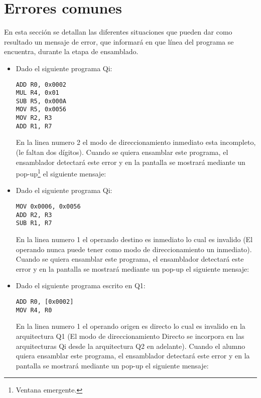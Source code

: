 \section{Errores comunes}


En esta sección se detallan las diferentes situaciones que pueden dar como resultado un mensaje de error, que informará en que línea del programa se encuentra, durante la etapa de ensamblado.

\begin{itemize}

\item Dado el siguiente programa Qi:

\begin{verbatim}
ADD R0, 0x0002
MUL R4, 0x01
SUB R5, 0x000A
MOV R5, 0x0056
MOV R2, R3
ADD R1, R7
\end{verbatim}

En la linea numero 2 el modo de direccionamiento inmediato esta incompleto, (le faltan dos dígitos). Cuando se quiera ensamblar este programa, el ensamblador detectará este error y en la pantalla se mostrará mediante un pop-up\footnote{Ventana emergente.} el siguiente mensaje:
 

\item Dado el siguiente programa Qi:

\begin{verbatim}
MOV 0x0006, 0x0056
ADD R2, R3
SUB R1, R7
\end{verbatim}

En la linea numero 1 el operando destino es inmediato lo cual es invalido (El operando nunca puede tener como modo de direccionamiento un inmediato). Cuando se quiera ensamblar este programa, el ensamblador detectará este error y en la pantalla se mostrará mediante un pop-up el siguiente mensaje:


\item Dado el siguiente programa escrito en Q1:

\begin{verbatim}
ADD R0, [0x0002]
MOV R4, R0
\end{verbatim}

En la linea numero 1 el operando origen es directo lo cual es invalido en la arquitectura Q1 (El modo de direccionamiento Directo se incorpora en las arquitecturas Qi desde la arquitectura Q2 en adelante). Cuando el alumno quiera ensamblar este programa, el ensamblador detectará este error y en la pantalla se mostrará mediante un pop-up el siguiente mensaje:


\end{itemize}
